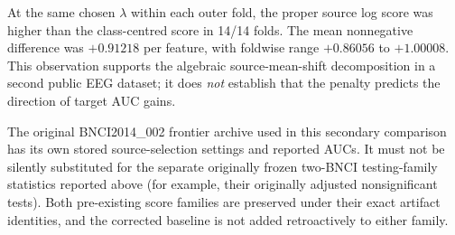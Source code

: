 At the same chosen \(\lambda\) within each
outer fold, the proper source log score
was higher than the class-centred score in
14/14 folds. The mean nonnegative difference
was \(+0.91218\) per feature, with foldwise
range \(+0.86056\) to \(+1.00008\).
This observation supports the algebraic
source-mean-shift decomposition in a second
public EEG dataset; it does \emph{not}
establish that the penalty predicts the
direction of target AUC gains.

The original BNCI2014\_002 frontier archive
used in this secondary comparison has its
own stored source-selection settings and
reported AUCs. It must not be silently
substituted for the separate originally frozen
two-BNCI testing-family statistics reported
above (for example, their originally
adjusted nonsignificant tests). Both
pre-existing score families are preserved
under their exact artifact identities,
and the corrected baseline is not added
retroactively to either family.
